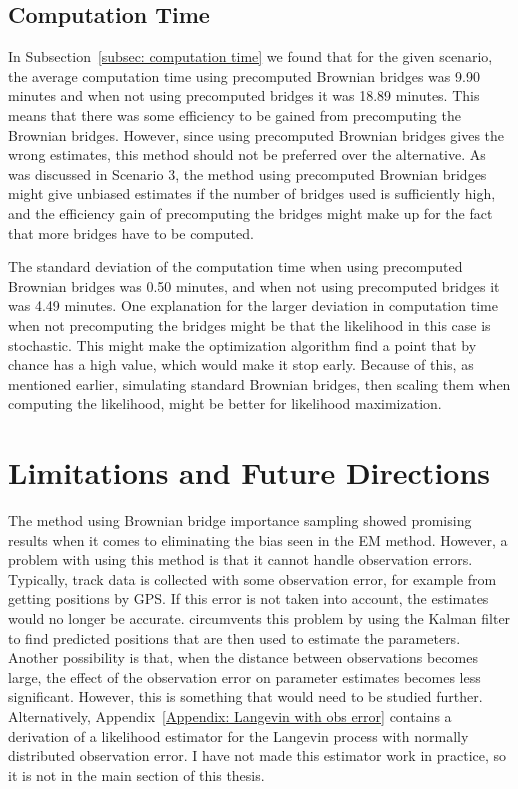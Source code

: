 \subsection{Computation Time}

In Subsection~\ref{subsec: computation time} we found that for the given scenario, the average computation time using precomputed Brownian bridges was 9.90 minutes and when not using precomputed bridges it was 18.89 minutes. This means that there was some efficiency to be gained from precomputing the Brownian bridges. However, since using precomputed Brownian bridges gives the wrong estimates, this method should not be preferred over the alternative. As was discussed in Scenario 3, the method using precomputed Brownian bridges might give unbiased estimates if the number of bridges used is sufficiently high, and the efficiency gain of precomputing the bridges might make up for the fact that more bridges have to be computed.


The standard deviation of the computation time when using precomputed Brownian bridges was 0.50 minutes, and when not using precomputed bridges it was 4.49 minutes. One explanation for the larger deviation in computation time when not precomputing the bridges might be that the likelihood in this case is stochastic. This might make the optimization algorithm find a point that by chance has a high value, which would make it stop early. Because of this, as mentioned earlier, simulating standard Brownian bridges, then scaling them when computing the likelihood, might be better for likelihood maximization.





\section{Limitations and Future Directions}
The method using Brownian bridge importance sampling showed promising results when it comes to eliminating the bias seen in the EM method. However, a problem with using this method is that it cannot handle observation errors. Typically, track data is collected with some observation error, for example from getting positions by GPS. If this error is not taken into account, the estimates would no longer be accurate. \textcite{michelot_langevin_2019} circumvents this problem by using the Kalman filter to find predicted positions that are then used to estimate the parameters. Another possibility is that, when the distance between observations becomes large, the effect of the observation error on parameter estimates becomes less significant. However, this is something that would need to be studied further. Alternatively, Appendix~\ref{Appendix: Langevin with obs error} contains a derivation of a likelihood estimator for the Langevin process with normally distributed observation error. I have not made this estimator work in practice, so it is not in the main section of this thesis.



